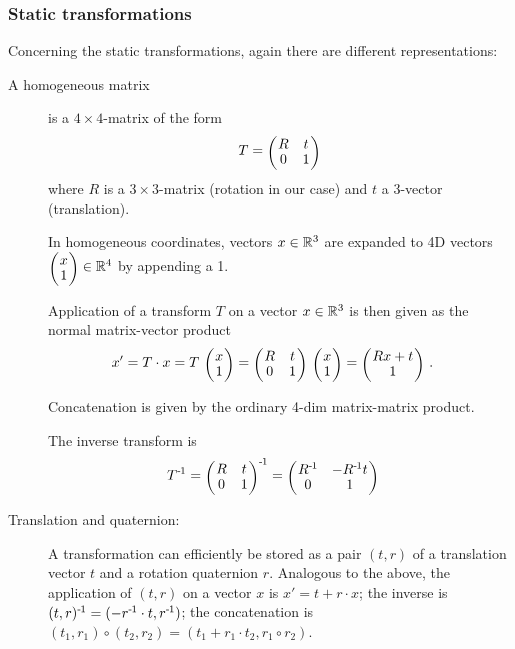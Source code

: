 \subsubsection{Static transformations}

Concerning the static transformations, again there are different
representations:
\begin{description}
\item[A homogeneous matrix] is a $4\times 4$-matrix of the form
\begin{align}
T = \mat{cc}{R & t \\ 0 & 1}
\end{align}
where $R$ is a $3\times 3$-matrix (rotation in our case) and $t$ a
$3$-vector (translation).

In homogeneous coordinates, vectors $x\in{\mathbb{R}}^3$ are expanded to 4D
vectors $\mat{c}{x\\1} \in \RRR^4$ by appending a 1.

Application of a transform $T$ on a vector $x\in{\mathbb{R}}^3$ is then given
as the normal matrix-vector product
\begin{align}
x' = T \cdot x
 &= T~ \mat{c}{x \\ 1}
  = \mat{cc}{R & t \\ 0 & 1}~ \mat{c}{x \\ 1}
  = \mat{c}{Rx + t \\ 1} ~.
\end{align}

Concatenation is given by the ordinary 4-dim matrix-matrix product.

The inverse transform is
\begin{align}
T^\1
 &= \mat{cc}{R & t \\ 0 & 1}^\1
  = \mat{cc}{R^\1 & -R^\1 t \\ 0 & 1}
\end{align}

\item[Translation and quaternion:] A transformation can efficiently be
  stored as a pair $(t,r)$ of a translation vector $t$ and a rotation
  quaternion $r$. Analogous to the above, the application of $(t,r)$
  on a vector $x$ is $x' = t + r\cdot x$; the inverse is $(t,r)^{{\hspace*{-.0pt}\text{\rm -}\hspace*{-.5pt}}1} =
  (-r^{{\hspace*{-.0pt}\text{\rm -}\hspace*{-.5pt}}1}\cdot t, r^{{\hspace*{-.0pt}\text{\rm -}\hspace*{-.5pt}}1})$; the concatenation is $(t_1,r_1) \circ
  (t_2,r_2) = (t_1 + r_1\cdot t_2, r_1 \circ r_2)$.
\end{description}

